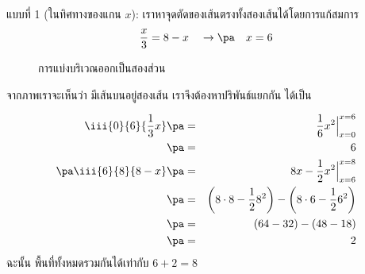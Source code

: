 \begin{frame}
\begin{sol} แบบที่ 1 (ในทิศทางของแกน $x$): \pa เราหาจุดตัดของเส้นตรงทั้งสองเส้นได้โดยการแก้สมการ \pa
\[ \frac{x}{3} = 8-x \quad \rightarrow \pa \quad x = 6\]

\begin{figure}[h!]
\centering
{}
\caption{การแบ่งบริเวณออกเป็นสองส่วน}
\end{figure}

จากภาพเราจะเห็นว่า มีเส้นบนอยู่สองเส้น เราจึงต้องหาปริพันธ์แยกกัน ได้เป็น
\end{sol}
\end{frame}

\begin{frame}
\begin{sol}
\begin{eqnarray*}
\iii{0}{6}{\frac{1}{3}x} \pa &=& \frac{1}{6}x^2 \Big|_{x=0}^{x=6} \\ \pa
&=& 6\\ \pa
\iii{6}{8}{8-x} \pa &=& 8x - \frac{1}{2}x^2 \Big|_{x=6}^{x=8} \\ \pa
&=& \left(8\cdot 8 - \frac{1}{2}8^2\right) - \left(8\cdot 6 - \frac{1}{2} 6^2 \right) \\ \pa
&=& (64-32) - (48 - 18) \\ \pa
&=& 2
\end{eqnarray*}
ฉะนั้น พื้นที่ทั้งหมดรวมกันได้เท่ากับ $6+2=8$
\end{sol}
\end{frame}

